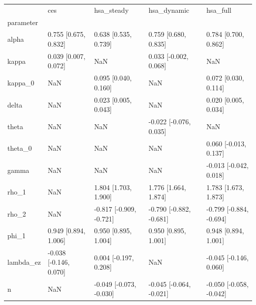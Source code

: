 \begin{tabular}{lllll}
\toprule
 & ces & hsa\_steady & hsa\_dynamic & hsa\_full \\
parameter &  &  &  &  \\
\midrule
alpha & 0.755 [0.675, 0.832] & 0.638 [0.535, 0.739] & 0.759 [0.680, 0.835] & 0.784 [0.700, 0.862] \\
kappa & 0.039 [0.007, 0.072] & NaN & 0.033 [-0.002, 0.068] & NaN \\
kappa\_0 & NaN & 0.095 [0.040, 0.160] & NaN & 0.072 [0.030, 0.114] \\
delta & NaN & 0.023 [0.005, 0.043] & NaN & 0.020 [0.005, 0.034] \\
theta & NaN & NaN & -0.022 [-0.076, 0.035] & NaN \\
theta\_0 & NaN & NaN & NaN & 0.060 [-0.013, 0.137] \\
gamma & NaN & NaN & NaN & -0.013 [-0.042, 0.018] \\
rho\_1 & NaN & 1.804 [1.703, 1.900] & 1.776 [1.664, 1.874] & 1.783 [1.673, 1.873] \\
rho\_2 & NaN & -0.817 [-0.909, -0.721] & -0.790 [-0.882, -0.681] & -0.799 [-0.884, -0.694] \\
phi\_1 & 0.949 [0.894, 1.006] & 0.950 [0.895, 1.004] & 0.950 [0.895, 1.001] & 0.948 [0.894, 1.001] \\
lambda\_ez & -0.038 [-0.146, 0.070] & 0.004 [-0.197, 0.208] & NaN & -0.045 [-0.146, 0.060] \\
n & NaN & -0.049 [-0.073, -0.030] & -0.045 [-0.064, -0.021] & -0.050 [-0.058, -0.042] \\
\bottomrule
\end{tabular}
